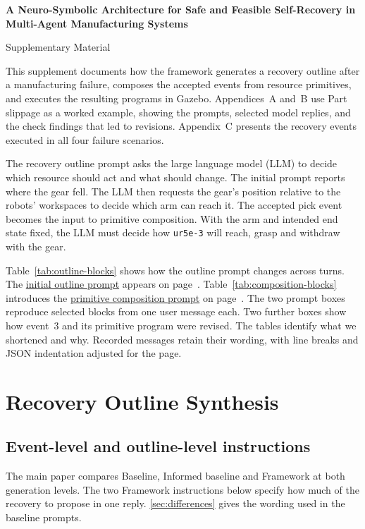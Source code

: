 \documentclass[preprint,12pt,authoryear]{elsarticle}
\let\code\nolinkurl
\newcommand{\papertitle}{A Neuro-Symbolic Architecture for Safe and Feasible Self-Recovery in Multi-Agent Manufacturing Systems}
\begin{document}
\pagestyle{plain}
\begin{center}
  {\Large\bfseries \papertitle\par}
  \medskip
  {\large Supplementary Material\par}
\end{center}

This supplement documents how the framework generates a recovery outline
after a manufacturing failure, composes the accepted events from resource
primitives, and executes the resulting programs in Gazebo. Appendices~A and~B
use Part slippage as a worked example, showing the prompts, selected model
replies, and the check findings that led to revisions. Appendix~C presents
the recovery events executed in all four failure scenarios.

The recovery outline prompt asks the large language model (LLM) to decide
which resource should act and what should change. The initial prompt reports
where the gear fell. The LLM then requests the gear's position relative to
the robots' workspaces to decide which arm can reach it. The accepted pick
event becomes the input to primitive composition. With the arm and intended
end state fixed, the LLM must decide how \code{ur5e-3} will reach, grasp and
withdraw with the gear.

Table~\ref{tab:outline-blocks} shows how the outline prompt changes across turns.
The \hyperref[sec:outline-prompt]{initial outline prompt} appears on
page~\pageref{sec:outline-prompt}. Table~\ref{tab:composition-blocks} introduces
the \hyperref[sec:composition-prompt]{primitive composition prompt} on
page~\pageref{sec:composition-prompt}. The two prompt boxes reproduce selected blocks from one user message each.
Two further boxes show how event~3 and its primitive program were revised.
The tables identify what we shortened and why. Recorded messages retain their
wording, with line breaks and JSON indentation adjusted for the page.

\appendix
\section{Recovery Outline Synthesis}
\subsection{Event-level and outline-level instructions}

The main paper compares Baseline, Informed baseline and Framework at both
generation levels. The two Framework instructions below specify how much of
the recovery to propose in one reply. \ref{sec:differences} gives the wording
used in the baseline prompts.
\end{document}
